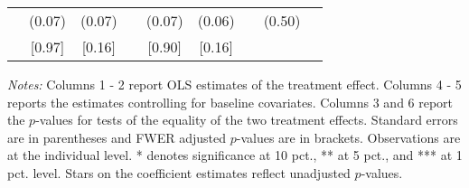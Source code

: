 \begin{table}[htbp]
{\begin{threeparttable}
\begin{tabular}{l*{8}{c}}
          &   (0.07)&   (0.07)&         &   (0.07)&   (0.06)&         &   (0.50)&         \\
          &   [0.97]&   [0.16]&         &   [0.90]&   [0.16]&         &         &         \\
\bottomrule \end{tabular} \begin{tablenotes}[flushleft] \footnotesize \item \emph{Notes:} Columns 1 - 2 report OLS estimates of the treatment effect. Columns 4 - 5 reports the estimates controlling for baseline covariates. Columns 3 and 6 report the \(p\)-values for tests of the equality of the two treatment effects. Standard errors are in parentheses and FWER adjusted \(p\)-values are in brackets. Observations are at the individual level. * denotes significance at 10 pct., ** at 5 pct., and *** at 1 pct. level. Stars on the coefficient estimates reflect unadjusted \(p\)-values. \end{tablenotes} \end{threeparttable} } \end{table}

